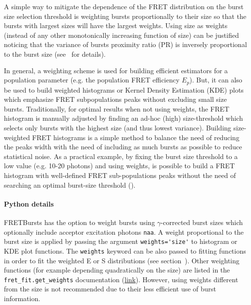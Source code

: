 \documentclass[10pt,letterpaper]{article}
\begin{document}
A simple way to mitigate the dependence of the FRET distribution on
the burst size selection threshold is weighting bursts proportionally to their size
so that the bursts with largest sizes will have the largest weights.
Using size as weights (instead of any other monotonically increasing function
of size) can be justified noticing that the variance of bursts proximity ratio (PR) is
inversely proportional to the burst size (see~ for details). %

In general, a weighting scheme is used for building efficient estimators for a population
parameter (e.g. the population FRET efficiency $E_p$).
But, it can also be used to build weighted histograms or Kernel Density
Estimation (KDE) plots which emphasize FRET subpopulations peaks
without excluding small size bursts.
Traditionally, for optimal results when not using weights, the
FRET histogram is manually adjusted by finding an ad-hoc (high)
size-threshold which selects only bursts with the highest size (and thus lowest variance).
Building size-weighted FRET histograms is a simple method to balance
the need of reducing the peaks width with the need of including as much bursts
as possible to reduce statistical noise.
As a practical example, by fixing the burst size threshold to a low value (e.g. 10-20 photons)
and using weights, is possible to build a FRET histogram with well-defined FRET sub-populations peaks
without the need of searching an optimal burst-size threshold ().

\paragraph*{Python details}
FRETBursts has the option to weight bursts using $\gamma$-corrected
burst sizes which optionally include acceptor excitation photons \verb|naa|.
A weight proportional to the burst size is applied by passing the argument
\verb|weights='size'| to histogram or KDE plot functions. The \verb|weights|
keyword can be also passed to fitting functions in order to fit
the weighted E or S distributions (see section~).
Other weighting functions (for example depending quadratically on the size)
are listed in the \verb|fret_fit.get_weights| documentation
(\href{http://fretbursts.readthedocs.org/en/latest/fret_fit.html#fretbursts.fret_fit.get_weights}{link}).
However, using weights different from the size is not recommended
due to their less efficient use of burst information.
\end{document}
